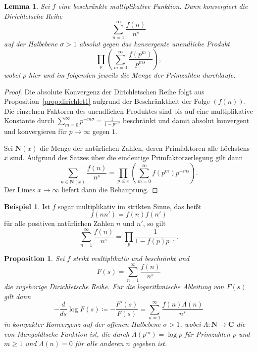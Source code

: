 \documentclass[a4paper,twoside,openright]{report}
\newtheorem{prop}[thm]{Proposition}
\newtheorem{lem}[thm]{Lemma}
\theoremstyle{definition}
\newtheorem{xca}[thm]{Beispiel}
\theoremstyle{remark}
\begin{document}
\begin{lem}
  \label{lem:multiplicative}
  Sei $f$ eine beschränkte multiplikative Funktion. Dann konvergiert
  die Dirichletsche Reihe
  \[
    \sum_{n = 1}^\infty \frac{f(n)}{n^s}
  \]
  auf der Halbebene $\sigma > 1$ absolut gegen das konvergente unendliche
  Produkt
  \[
    \prod_p \left(\sum_{m = 0}^\infty \frac{f(p^m)}{p^{m s}}\right),
  \]
  wobei $p$ hier und im folgenden jeweils die Menge der Primzahlen durchlaufe.
\end{lem}

\begin{proof}
  Die absolute Konvergenz der Dirichletschen Reihe folgt aus Proposition~\ref{prop:dirichlet1}
  aufgrund der Beschränktheit der Folge $(f(n))$. Die einzelnen Faktoren des
  unendlichen Produktes sind bis auf eine multiplikative Konstante durch
  $\sum_{m = 0}^\infty p^{-m \sigma} = \frac 1 {1 - p^{-\sigma}}$ beschränkt und damit absolut
  konvergent und konvergieren für $p \to \infty$ gegen $1$.
  
  Sei $\mathbf N(x)$ die Menge der natürlichen Zahlen, deren Primfaktoren alle
  höchstens $x$ sind. Aufgrund des Satzes über die eindeutige Primfaktorzerlegung
  gilt dann
  \[
    \sum_{n \in \mathbf N(x)} \frac{f(n)}{n^s} = \prod_{p \leq x}
    \left(\sum_{m = 0}^\infty f(p^m) p^{-ms}\right).
  \]
  Der Limes $x \to \infty$ liefert dann die Behauptung.
\end{proof}

\begin{xca}
  \label{xca:multiplicative}
  Ist $f$ sogar multiplikativ im strikten Sinne, das heißt
  \[
    f(n n') = f(n) f(n')
  \]
  für alle positiven natürlichen Zahlen $n$ und $n'$, so gilt
  \[
    \sum_{n = 1}^\infty \frac{f(n)}{n^s} = \prod_p \frac 1 {1 - f(p) p^{-s}}.
  \]
\end{xca}

\begin{prop}
  \label{prop:multiplicative}
  Sei $f$ strikt multiplikativ und beschränkt und
  \[
    F(s) = \sum_{n = 1}^\infty \frac{f(n)}{n^s}
  \]
  die zugehörige Dirichletsche Reihe. Für die \emph{logarithmische Ableitung}
  von $F(s)$ gilt dann
  \[
    - \frac d{ds} \log F(s) \coloneqq - \frac{F'(s)}{F(s)} =
    \sum_{n = 1}^\infty \frac{f(n) \Lambda(n)}{n^s}
  \]
  in kompakter Konvergenz auf der offenen Halbebene $\sigma > 1$, wobei
  $\Lambda\colon \mathbf N \to \mathbf C$ die \emph{von Mangoldtsche Funktion}
  ist, die durch $\Lambda(p^m) = \log p$ für Primzahlen $p$ und $m \ge 1$ und
  $\Lambda(n) = 0$ für alle anderen $n$ gegeben ist.
\end{prop}
\end{document}
